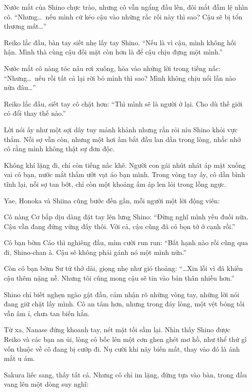 \documentclass[../main.tex]{subfiles}
\begin{document}
Nước mắt của Shino chực trào, nhưng cô vẫn ngẩng đầu lên, đôi mắt đẫm lệ nhìn cô. ``Nhưng\dots\ nếu mình cứ kéo cậu vào những rắc rối này thì sao? Cậu sẽ bị tổn thương mất\dots''

Reiko lắc đầu, bàn tay siết nhẹ lấy tay Shino. ``Nếu là vì cậu, mình không hối hận. Mình thà cùng cậu đối mặt còn hơn là để cậu chịu đựng một mình.''

Nước mắt cô nàng tóc nâu rơi xuống, hòa vào những lời trong tiếng nấc: ``Nhưng\dots\ nếu rồi tất cả lại rời bỏ mình thì sao? Mình không chịu nổi lần nào nữa đâu\dots''

Reiko lắc đầu, siết tay cô chặt hơn: ``Thì mình sẽ là người ở lại. Cho dù thế giới có đổi thay thế nào.''

Lời nói ấy như một sợi dây tuy mảnh khảnh nhưng rắn rỏi níu Shino khỏi vực thẳm. Nỗi sợ vẫn còn, nhưng một hơi ấm bắt đầu lan dần trong lòng, nhắc nhở cô rằng mình không thật sự đơn độc.

Không khí lặng đi, chỉ còn tiếng nấc khẽ. Người con gái nhút nhát áp mặt xuống vai cô bạn, nước mắt thấm ướt vạt áo bạn mình. Trong vòng tay ấy, cô dần bình tĩnh lại, nỗi sợ tan bớt, chỉ còn một khoảng ấm áp len lỏi trong lồng ngực.

Yae, Honoka và Shiina cũng bước đến gần, mỗi người một lời động viên:

Cô nàng Cơ bắp dịu dàng đặt tay lên lưng Shino: ``Đừng nghĩ mình yếu đuối nữa. Cậu vẫn đang đứng vững đấy thôi. Với cả, cậu cũng đã có bọn tớ ở cạnh rồi.''

Cô bạn bờm Cáo thì nghiêng đầu, mỉm cười run run: ``Bất hạnh nào rồi cũng qua đi, Shino-chan à. Cậu sẽ không phải gánh nó một mình nữa.''

Còn cô bạn bờm Sư tử thở dài, giọng nhẹ như gió thoảng: ``\dots Xin lỗi vì đã khiến cậu thêm nặng nề. Nhưng tôi cũng mong cậu sẽ tin vào bản thân nhiều hơn.''

Shino chỉ biết nghẹn ngào gật đầu, cảm nhận rõ những vòng tay, những lời nói đang giữ chặt lấy mình. Cô an tâm hơn, nhưng trong đáy lòng, một vệt bóng tối vẫn âm ỉ, chưa tan biến hẳn.

Từ xa, Nanase đứng khoanh tay, nét mặt tối sầm lại. Nhìn thấy Shino được Reiko và các bạn an ủi, lòng cô bốc lên một cơn ghen ghét mơ hồ, như thể thứ gì vốn thuộc về cô đang bị cướp đi. Nụ cười khi nãy biến mất, thay vào đó là ánh mắt u ám.

Sakura liếc sang, thấy tất cả. Nhưng cô chỉ im lặng, đứng tựa vào bàn, trong đầu vang lên một dòng suy nghĩ:
\end{document}
